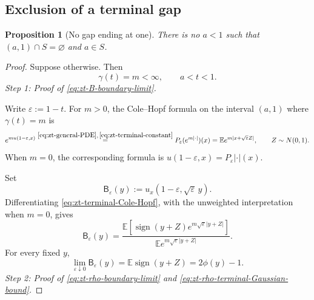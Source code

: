 \documentclass[10pt]{amsart}
\newtheorem{proposition}[proposition]{Proposition}
\theoremstyle{definition}
\theoremstyle{remark}
\numberwithin{equation}{section}
\newcommand{\E}{\mathbb E}
\newcommand{\1}{\mathbf 1}
\newcommand{\stackref}[2]{\stackrel{#2}{#1}}
\begin{document}
\subsection{Exclusion of a terminal gap}
\label{sec:zt-terminal-gap}

\begin{proposition}[No gap ending at one]
\label{prop:zt-no-terminal-gap}
There is no $a<1$ such that $(a,1)\cap S=\varnothing$ and $a\in S$.
\end{proposition}

\begin{proof}
Suppose otherwise.  Then
\begin{equation}
 \gamma(t)=m<\infty,\qquad a<t<1.
 \label{eq:zt-terminal-constant}
\end{equation}
\smallskip
\noindent\emph{Step 1: Proof of \eqref{eq:zt-B-boundary-limit}.}

Write $\varepsilon:=1-t$. For $m>0$, the Cole--Hopf formula on the interval $(a,1)$ where $\gamma(t)=m$ is
\begin{equation}
 e^{mu(1-\varepsilon,x)}
 \stackref{=}{\eqref{eq:zt-general-PDE},\,\eqref{eq:zt-terminal-constant}}
 P_\varepsilon(e^{m|\cdot|})(x)
 =\E e^{m|x+\sqrt\varepsilon Z|},
 \qquad Z\sim N(0,1).
 \label{eq:zt-terminal-Cole-Hopf}
\end{equation}
When $m=0$, the corresponding formula is $u(1-\varepsilon,x)=P_\varepsilon|\cdot|(x)$.

Set
\begin{equation*}
 \mathsf B_\varepsilon(y):=u_x(1-\varepsilon,\sqrt\varepsilon\,y).
\end{equation*}
Differentiating \eqref{eq:zt-terminal-Cole-Hopf}, with the unweighted interpretation when $m=0$, gives
\begin{equation}
 \mathsf B_\varepsilon(y)=
 \frac{\E\!\left[
 \operatorname{sign}(y+Z)e^{m\sqrt\varepsilon|y+Z|}
 \right]}
 {\E e^{m\sqrt\varepsilon|y+Z|}}.
 \label{eq:zt-B-epsilon-ratio}
\end{equation}
For every fixed $y$,
\begin{equation}
 \lim_{\varepsilon\downarrow0}\mathsf B_\varepsilon(y)
 =\E\operatorname{sign}(y+Z)
 =2\phi(y)-1.
 \label{eq:zt-B-boundary-limit}
\end{equation}
\smallskip
\noindent\emph{Step 2: Proof of \eqref{eq:zt-rho-boundary-limit} and \eqref{eq:zt-rho-terminal-Gaussian-bound}.}


\end{proof}
\end{document}
